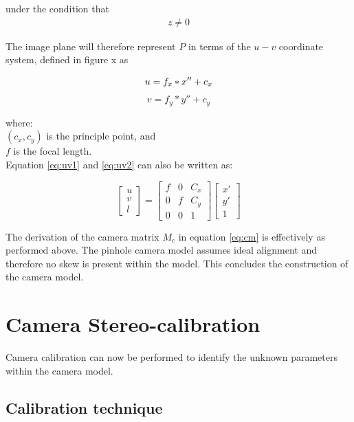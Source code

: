 under the condition that \begin{align*} z \neq 0 \end{align*}

The image plane will therefore represent $P$ in terms of the $u-v$ coordinate system, defined in figure x as 

\begin{equation}\label{eq:uv1}u = f_x*x'' + c_x \\ \end{equation}
\begin{equation}\label{eq:uv2}v = f_y*y'' + c_y \end{equation}

where:\\
$(c_x, c_y)$ is the principle point, and\\
$f$ is the focal length.\\

Equation \ref{eq:uv1} and \ref{eq:uv2} can also be written as:

\begin{equation}
\begin{bmatrix}u\\v\\l\end{bmatrix} =  
\begin{bmatrix}
f & 0 & C_x\\
0 & f & C_y\\
0 & 0 & 1
\end{bmatrix}
\begin{bmatrix}x'\\y'\\1\end{bmatrix}
\end{equation}

The derivation of the camera matrix $M_c$ in equation \ref{eq:cm} is effectively as performed above. The pinhole camera model assumes ideal alignment and therefore no skew is present within the model. This concludes the construction of the camera model.

\section{Camera Stereo-calibration}

Camera calibration can now be performed to identify the unknown parameters within the camera model.

\subsection{Calibration technique}
\label{sec:cal_technique}

